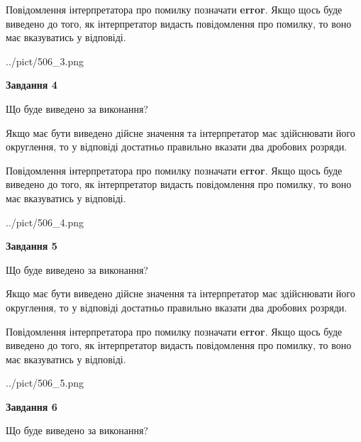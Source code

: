 \documentclass[12pt, ukrainian]{article}
\begin{document}
{\begin {Large}
Повідомлення інтерпретатора про помилку позначати \textbf{error}.
Якщо щось буде виведено до того, як інтерпретатор видасть повідомлення про помилку, 
то воно має вказуватись у відповіді. \par

\begin{center}
	{../pict/506_3.png}
\end{center}
\newpage

{\begin {center}\textbf{Завдання 4}\end {center}}\par
Що буде виведено за виконання? \par

Якщо має бути виведено дійсне значення та інтерпретатор має здійснювати його округлення, 
то у відповіді достатньо правильно вказати два дробових розряди.

Повідомлення інтерпретатора про помилку позначати \textbf{error}.
Якщо щось буде виведено до того, як інтерпретатор видасть повідомлення про помилку, 
то воно має вказуватись у відповіді. \par

\begin{center}
	{../pict/506_4.png}
\end{center}
\newpage

{\begin {center}\textbf{Завдання 5}\end {center}}\par
Що буде виведено за виконання? \par

Якщо має бути виведено дійсне значення та інтерпретатор має здійснювати його округлення, 
то у відповіді достатньо правильно вказати два дробових розряди.

Повідомлення інтерпретатора про помилку позначати \textbf{error}.
Якщо щось буде виведено до того, як інтерпретатор видасть повідомлення про помилку, 
то воно має вказуватись у відповіді. \par

\begin{center}
	{../pict/506_5.png}
\end{center}
\newpage

{\begin {center}\textbf{Завдання 6}\end {center}}\par
Що буде виведено за виконання? \par


\end{Large}}
\end{document}
